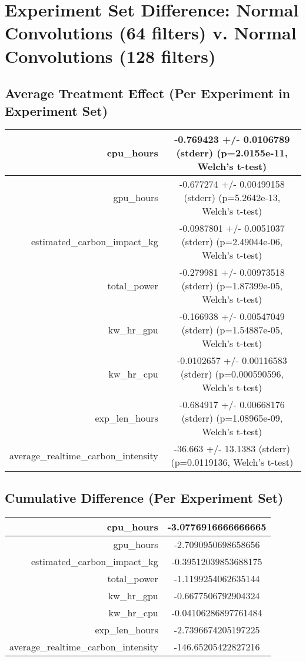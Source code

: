 \documentclass{article}%
\begin{document}
%
\normalsize%
\section{Experiment Set Difference: Normal Convolutions (64 filters) v. Normal Convolutions (128 filters)}%
\label{sec:Experiment Set Difference Normal Convolutions (64 filters) v. Normal Convolutions (128 filters)}%
\subsection{Average Treatment Effect (Per Experiment in Experiment Set)}%
\label{subsec:Average Treatment Effect (Per Experiment in Experiment Set)}%
\begin{tabular}{|r|c|}%
\hline%
cpu\_hours&{-}0.769423 +/{-} 0.0106789 (stderr) (p=2.0155e{-}11, Welch's t{-}test)\\%
\hline%
gpu\_hours&{-}0.677274 +/{-} 0.00499158 (stderr) (p=5.2642e{-}13, Welch's t{-}test)\\%
\hline%
estimated\_carbon\_impact\_kg&{-}0.0987801 +/{-} 0.0051037 (stderr) (p=2.49044e{-}06, Welch's t{-}test)\\%
\hline%
total\_power&{-}0.279981 +/{-} 0.00973518 (stderr) (p=1.87399e{-}05, Welch's t{-}test)\\%
\hline%
kw\_hr\_gpu&{-}0.166938 +/{-} 0.00547049 (stderr) (p=1.54887e{-}05, Welch's t{-}test)\\%
\hline%
kw\_hr\_cpu&{-}0.0102657 +/{-} 0.00116583 (stderr) (p=0.000590596, Welch's t{-}test)\\%
\hline%
exp\_len\_hours&{-}0.684917 +/{-} 0.00668176 (stderr) (p=1.08965e{-}09, Welch's t{-}test)\\%
\hline%
average\_realtime\_carbon\_intensity&{-}36.663 +/{-} 13.1383 (stderr) (p=0.0119136, Welch's t{-}test)\\%
\hline%
\end{tabular}

%
\subsection{Cumulative Difference (Per Experiment Set)}%
\label{subsec:Cumulative Difference (Per Experiment Set)}%
\begin{tabular}{|r|c|}%
\hline%
cpu\_hours&{-}3.0776916666666665\\%
\hline%
gpu\_hours&{-}2.7090950698658656\\%
\hline%
estimated\_carbon\_impact\_kg&{-}0.39512039853688175\\%
\hline%
total\_power&{-}1.1199254062635144\\%
\hline%
kw\_hr\_gpu&{-}0.6677506792904324\\%
\hline%
kw\_hr\_cpu&{-}0.04106286897761484\\%
\hline%
exp\_len\_hours&{-}2.7396674205197225\\%
\hline%
average\_realtime\_carbon\_intensity&{-}146.65205422827216\\%
\hline%
\end{tabular}

%
\end{document}
